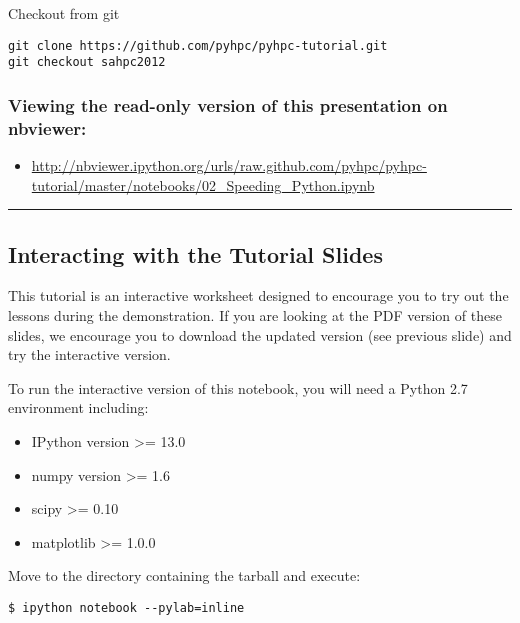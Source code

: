 \documentclass{article}
\begin{document}
Checkout from git

\begin{verbatim}
git clone https://github.com/pyhpc/pyhpc-tutorial.git
git checkout sahpc2012
\end{verbatim}

\subsubsection{Viewing the read-only version of this presentation on
nbviewer:}\label{viewing-the-read-only-version-of-this-presentation-on-nbviewer}

\begin{itemize}
\itemsep1pt\parskip0pt
\item
  \url{http://nbviewer.ipython.org/urls/raw.github.com/pyhpc/pyhpc-tutorial/master/notebooks/02\_Speeding\_Python.ipynb}
\end{itemize}

    \begin{center}\rule{3in}{0.4pt}\end{center}

\subsection{Interacting with the Tutorial
Slides}\label{interacting-with-the-tutorial-slides}

This tutorial is an interactive worksheet designed to encourage you to
try out the lessons during the demonstration. If you are looking at the
PDF version of these slides, we encourage you to download the updated
version (see previous slide) and try the interactive version.

To run the interactive version of this notebook, you will need a Python
2.7 environment including:

\begin{itemize}
\itemsep1pt\parskip0pt
\item
  IPython version \textgreater{}= 13.0
\item
  numpy version \textgreater{}= 1.6
\item
  scipy \textgreater{}= 0.10
\item
  matplotlib \textgreater{}= 1.0.0
\end{itemize}

Move to the directory containing the tarball and execute:

\begin{verbatim}
$ ipython notebook --pylab=inline
\end{verbatim}
\end{document}
